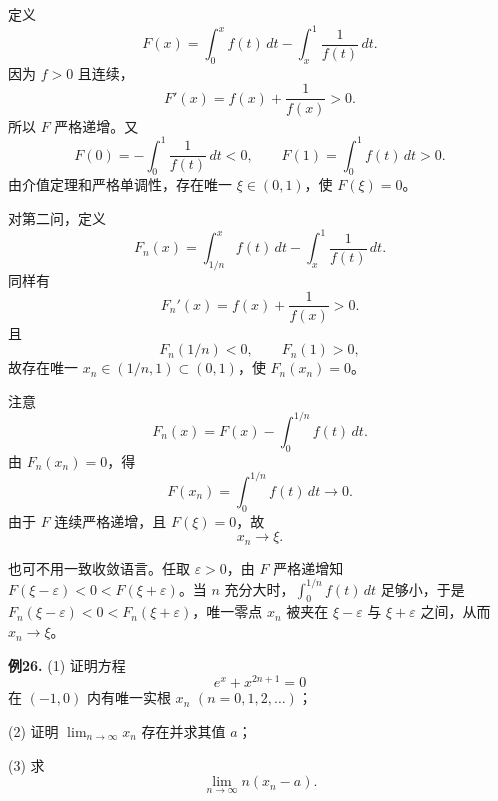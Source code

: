 \begin{solutionblock}

定义
\[
F(x)=\int_0^x f(t)\,dt-\int_x^1\frac1{f(t)}\,dt.
\]
因为 \(f>0\) 且连续，
\[
F'(x)=f(x)+\frac1{f(x)}>0.
\]
所以 \(F\) 严格递增。又
\[
F(0)=-\int_0^1\frac1{f(t)}\,dt<0,\qquad
F(1)=\int_0^1f(t)\,dt>0.
\]
由介值定理和严格单调性，存在唯一 \(\xi\in(0,1)\)，使 \(F(\xi)=0\)。

对第二问，定义
\[
F_n(x)=\int_{1/n}^x f(t)\,dt-\int_x^1\frac1{f(t)}\,dt.
\]
同样有
\[
F_n'(x)=f(x)+\frac1{f(x)}>0.
\]
且
\[
F_n(1/n)<0,\qquad F_n(1)>0,
\]
故存在唯一 \(x_n\in(1/n,1)\subset(0,1)\)，使 \(F_n(x_n)=0\)。

注意
\[
F_n(x)=F(x)-\int_0^{1/n}f(t)\,dt.
\]
由 \(F_n(x_n)=0\)，得
\[
F(x_n)=\int_0^{1/n}f(t)\,dt\to0.
\]
由于 \(F\) 连续严格递增，且 \(F(\xi)=0\)，故
\[
x_n\to\xi.
\]

也可不用一致收敛语言。任取 \(\varepsilon>0\)，由 \(F\) 严格递增知 \(F(\xi-\varepsilon)<0<F(\xi+\varepsilon)\)。当 \(n\) 充分大时，\(\int_0^{1/n}f(t)\,dt\) 足够小，于是 \(F_n(\xi-\varepsilon)<0<F_n(\xi+\varepsilon)\)，唯一零点 \(x_n\) 被夹在 \(\xi-\varepsilon\) 与 \(\xi+\varepsilon\) 之间，从而 \(x_n\to\xi\)。
\end{solutionblock}

\begin{problemblock}
\textbf{例26.} (1) 证明方程
\[
e^x+x^{2n+1}=0
\]
在 \((-1,0)\) 内有唯一实根 \(x_n\) \((n=0,1,2,\dots)\)；

(2) 证明 \(\displaystyle\lim_{n\to\infty}x_n\) 存在并求其值 \(a\)；

(3) 求
\[
\lim_{n\to\infty}n(x_n-a).
\]
\end{problemblock}


